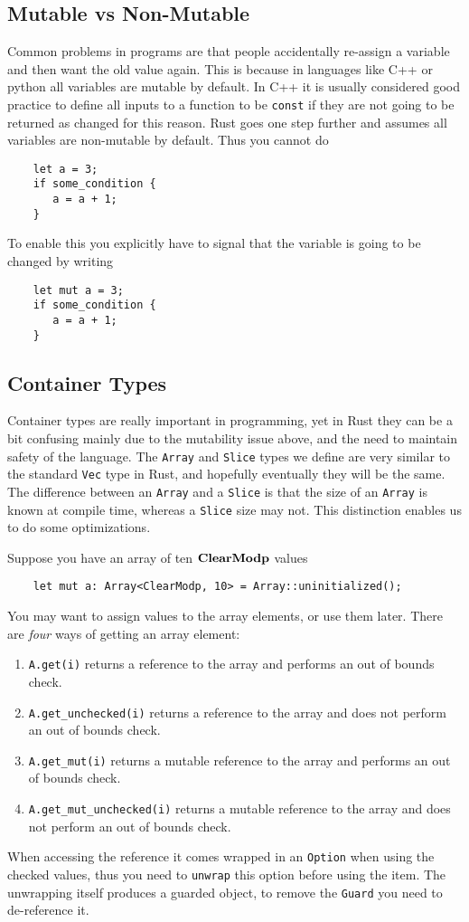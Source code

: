 \subsection{Mutable vs Non-Mutable}
Common problems in programs are that people accidentally re-assign
a variable and then want the old value again. This is because in
languages like C++ or python all variables are mutable by default.
In C++ it is usually considered good practice to define all inputs
to a function to be \verb|const| if they are not going to be returned
as changed for this reason.
Rust goes one step further and assumes all variables are non-mutable 
by default. Thus you cannot do
\begin{lstlisting}
    let a = 3;
    if some_condition {
       a = a + 1;
    }
\end{lstlisting}
To enable this you explicitly have to signal that the variable
is going to be changed by writing
\begin{lstlisting}
    let mut a = 3;
    if some_condition {
       a = a + 1;
    }
\end{lstlisting}

\subsection{Container Types}
Container types are really important in programming, yet in Rust
they can be a bit confusing mainly due to the mutability issue
above, and the need to maintain safety of the language.
The \verb|Array| and \verb|Slice| types we define are very similar
to the standard \verb|Vec| type in Rust, and hopefully eventually
they will be the same.
The difference between an  \verb|Array| and a \verb|Slice|  is that
the size of an  \verb|Array| is known at compile time, whereas
a \verb|Slice| size may not.
This distinction enables us to do some optimizations.

Suppose you have an array of ten $\mathbf{ClearModp}$ values
\begin{lstlisting}
    let mut a: Array<ClearModp, 10> = Array::uninitialized();
\end{lstlisting}
You may want to assign values to the array elements, or use them
later. There are {\em four} ways of getting an array element:
\begin{enumerate}
  \item \verb|A.get(i)| returns a reference to the array and performs
        an out of bounds check.
  \item \verb|A.get_unchecked(i)| returns a reference to the array and 
        does not perform an out of bounds check.
  \item \verb|A.get_mut(i)| returns a mutable reference to the array and performs
        an out of bounds check.
  \item \verb|A.get_mut_unchecked(i)| returns a mutable reference to the array and 
        does not perform an out of bounds check.
\end{enumerate}
When accessing the reference it comes wrapped in an \verb|Option| when
using the checked values, thus you need to \verb|unwrap| this option before
using the item. 
The unwrapping itself produces a guarded object, to remove the \verb|Guard| you 
need to de-reference it.

